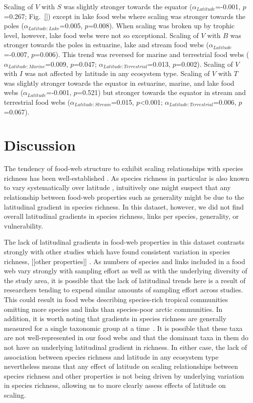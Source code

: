 \documentclass[12pt]{article}
\begin{document}
Scaling of $V$ with $S$ was slightly stronger towards the equator
($\alpha_{Latitude}$=-0.001, $p$=0.267; Fig.~\ref{}) except in lake food webs
where scaling was stronger towards the poles ($\alpha_{Latitude:Lake}$=0.005,
$p$=0.008). When scaling was broken up by trophic level, however, lake food
webs were not so exceptional. Scaling of $V$ with $B$ was stronger towards the
poles in estuarine, lake and stream food webs ($\alpha_{Latitude}$=-0.007,
$p$=0.006). This trend was reversed for marine and terrestrial food webs
($\alpha_{Latitude:Marine}$=0.009, $p$=0.047;
$\alpha_{Latitude:Terrestrial}$=0.013, $p$=0.002). Scaling of $V$ with $I$ was
not affected by latitude in any ecosystem type.  Scaling of $V$ with $T$ was
slightly stronger towards the equator in estuarine, marine, and lake food webs
($\alpha_{Latitude}$=-0.001, $p$=0.521) but stronger towards the equator in
stream and terrestrial food webs ($\alpha_{Latitude:Stream}$=0.015,
$p$\textless0.001; $\alpha_{Latitude:Terrestrial}$=0.006, $p$=0.067).



\section*{Discussion}

The tendency of food-web structure to exhibit scaling relationships with
species richness has been well-established \citep{Dunne2004,Riede2010}. As
species richness in particular is also known to vary systematically over
latitude \citep{}, intuitively one might suspect that any relationship
between food-web properties such as generality might be due to the latitudinal
gradient in species richness. In this dataset, however, we did not find
overall latitudinal gradients in species richness, links per species, 
generality, or vulnerability. 


The lack of latitudinal gradients in food-web properties in this dataset contrasts
strongly with other studies which have found consistent variation in species richness,
[[other properties]] \citep{}. As numbers of species and links included in a food web
vary strongly with sampling effort as well as with the underlying diversity of the study
area, it is possible that the lack of latitudinal trends here is a result of researchers
tending to expend similar amounts of sampling effort across studies. This could result in
food webs describing species-rich tropical communities omitting more species and links
than species-poor arctic communities. In addition, it is worth noting that gradients in
species richness are generally measured for a single taxonomic group at a time~\citep{}.
It is possible that these taxa are not well-represented in our food webs and that the
dominant taxa in them do not have an underlying latitudinal gradient in richness. In
either case, the lack of association between species richness
and latitude in any ecosystem type nevertheless means that any effect of latitude on scaling relationships
between species richness and other properties is not being driven by underlying variation in
species richness, allowing us to more clearly assess effects of latitude on scaling.
\end{document}
